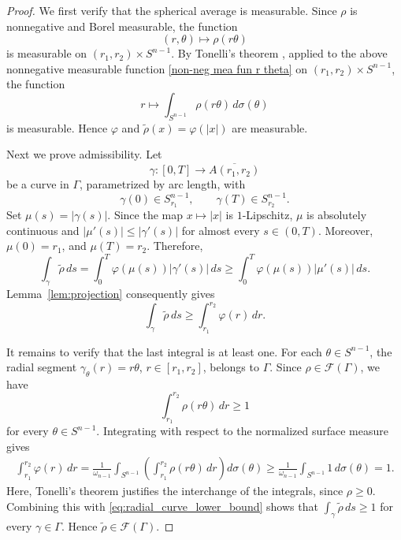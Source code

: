 \documentclass[12pt]{amsart}
\numberwithin{equation}{section}
\theoremstyle{plain}
\theoremstyle{definition}
\begin{document}
\begin{proof}
We first verify that the spherical average is measurable. Since $\rho$
is nonnegative and Borel measurable, the function
\begin{equation}\label{non-neg mea fun r theta}
(r,\theta)\longmapsto \rho(r\theta)
\end{equation}
is measurable on $(r_1,r_2)\times S^{n-1}$. By Tonelli's theorem \cite[Theorem 2.37]{Folland1999}, applied to the above nonnegative measurable function \eqref{non-neg mea fun r theta}
on $(r_1,r_2)\times S^{n-1}$, the function
\begin{equation*}
r\longmapsto
\int_{S^{n-1}}\rho(r\theta)\,d\sigma(\theta)
\end{equation*}
is measurable. %
Hence $\varphi$ and
$\widetilde\rho(x)=\varphi(|x|)$ are measurable.

Next we prove admissibility. Let
\begin{equation*}
\gamma:[0,T]\longrightarrow\overline{A(r_1,r_2)}
\end{equation*}
be a curve in $\Gamma$, parametrized by arc length, with
\begin{equation*}
\gamma(0)\in S_{r_1}^{n-1},
\qquad
\gamma(T)\in S_{r_2}^{n-1}.
\end{equation*}
Set
$\mu(s)=|\gamma(s)|$.
Since the map $x\mapsto|x|$ is $1$-Lipschitz, $\mu$ is absolutely
continuous and $|\mu'(s)|\le|\gamma'(s)|$ for almost every $s\in(0,T).$
Moreover, $\mu(0)=r_1$, and $\mu(T)=r_2$.
Therefore,
\begin{equation*}
\int_\gamma\widetilde\rho\,ds
=
\int_0^T
\varphi(\mu(s))|\gamma'(s)|\,ds
\ge
\int_0^T
\varphi(\mu(s))|\mu'(s)|\,ds.
\end{equation*}
Lemma~\ref{lem:projection} consequently gives
\begin{equation}
\label{eq:radial_curve_lower_bound}
\int_\gamma\widetilde\rho\,ds
\ge
\int_{r_1}^{r_2}\varphi(r)\,dr.
\end{equation}

It remains to verify that the last integral is at least one. For each
$\theta\in S^{n-1}$, the radial segment $\gamma_\theta(r)=r\theta$, $r\in[r_1,r_2]$,
belongs to $\Gamma$. Since $\rho\in\mathcal F(\Gamma)$, we have
\begin{equation*}
\int_{r_1}^{r_2}\rho(r\theta)\,dr\ge1
\end{equation*}
for every $\theta\in S^{n-1}$.
Integrating with respect to the normalized surface measure gives
\begin{align*}
\int_{r_1}^{r_2}\varphi(r)\,dr
=
\frac{1}{\omega_{n-1}}
\int_{S^{n-1}}
\left(
\int_{r_1}^{r_2}\rho(r\theta)\,dr
\right)d\sigma(\theta)
\ge
\frac{1}{\omega_{n-1}}
\int_{S^{n-1}}1\,d\sigma(\theta)
=
1.
\end{align*}
Here, Tonelli's theorem justifies the interchange of the integrals,
since $\rho\ge0$. Combining this with
\eqref{eq:radial_curve_lower_bound} shows that
$\int_\gamma\widetilde\rho\,ds\ge1$
for every $\gamma\in\Gamma$. Hence
$\widetilde\rho\in\mathcal F(\Gamma)$.


\end{proof}
\end{document}
